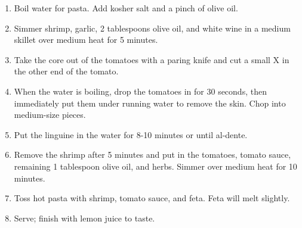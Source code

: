\documentclass[letterpaper]{recipe}
\begin{document}
 

\begin{enumerate}
\addtolength{\itemindent}{2em}
\item Boil water for pasta.  Add kosher salt and a pinch of olive oil.
\item Simmer shrimp, garlic, 2 tablespoons olive oil, and white wine in a medium skillet over medium heat for 5 minutes.
\item Take the core out of the tomatoes with a paring knife and cut a small X in the other end of the tomato.
\item When the water is boiling, drop the tomatoes in for 30 seconds, then immediately put them under running water to remove the skin.  Chop into medium-size pieces.
\item Put the linguine in the water for 8-10 minutes or until al-dente.
\item Remove the shrimp after 5 minutes and put in the tomatoes, tomato sauce, remaining 1 tablespoon olive oil, and herbs.  Simmer over medium heat for 10 minutes.
\item Toss hot pasta with shrimp, tomato sauce, and feta.  Feta will melt slightly.
\item Serve; finish with lemon juice to taste. 
\end{enumerate}
\end{document}
